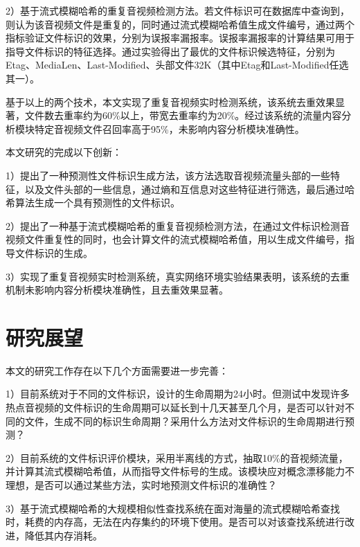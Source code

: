2）基于流式模糊哈希的重复音视频检测方法。若文件标识可在数据库中查询到，则认为该音视频文件是重复的，同时通过流式模糊哈希值生成文件编号，通过两个指标验证文件标识的效果，分别为误报率漏报率。误报率漏报率的计算结果可用于指导文件标识的特征选择。通过实验得出了最优的文件标识候选特征，分别为Etag、MediaLen、Last-Modified、头部文件32K（其中Etag和Last-Modified任选其一）。

基于以上的两个技术，本文实现了重复音视频实时检测系统，该系统去重效果显著，文件数去重率约为60\%以上，带宽去重率约为20\%。经过该系统的流量内容分析模块特定音视频文件召回率高于95\%，未影响内容分析模块准确性。

本文研究的完成以下创新：

1）提出了一种预测性文件标识生成方法，该方法选取音视频流量头部的一些特征，以及文件头部的一些信息，通过熵和互信息对这些特征进行筛选，最后通过哈希算法生成一个具有预测性的文件标识。

2）提出了一种基于流式模糊哈希的重复音视频检测方法，在通过文件标识检测音视频文件重复性的同时，也会计算文件的流式模糊哈希值，用以生成文件编号，指导文件标识的生成。

3）实现了重复音视频实时检测系统，真实网络环境实验结果表明，该系统的去重机制未影响内容分析模块准确性，且去重效果显著。

\section{研究展望}

本文的研究工作存在以下几个方面需要进一步完善：

1）目前系统对于不同的文件标识，设计的生命周期为24小时。但测试中发现许多热点音视频的文件标识的生命周期可以延长到十几天甚至几个月，是否可以针对不同的文件，生成不同的标识生命周期？采用什么方法对文件标识的生命周期进行预测？

2）目前系统的文件标识评价模块，采用半离线的方式，抽取10\%的音视频流量，并计算其流式模糊哈希值，从而指导文件标号的生成。该模块应对概念漂移能力不理想，是否可以通过某些方法，实时地预测文件标识的准确性？

3）基于流式模糊哈希的大规模相似性查找系统在面对海量的流式模糊哈希查找时，耗费的内存高，无法在内存集约的环境下使用。是否可以对该查找系统进行改进，降低其内存消耗。